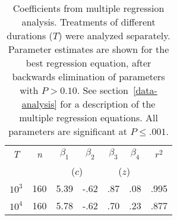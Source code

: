 
\begin{table}[btp!]
\caption{Coefficients from multiple regression analysis.  Treatments
  of different durations ($T$) were analyzed separately.  Parameter
  estimates are shown for the best regression equation, after backwards
  elimination of parameters with $P>0.10$.  See
  section~\protect\ref{data-analysis} for a description of the multiple
  regression equations.  All parameters are
  significant at $P\le .001$.
\label{tab:regress-coeffs}}
\begin{center}
\begin{tabular}{|c|c||cc|cc||c|} \hline
\emph{T} & \emph{n} & $\beta _1$ & $\beta _2$ & $\beta _3$ & $\beta _4$ & $r^2$ \\
 & & \multicolumn{2}{c|}{($c$)} & \multicolumn{2}{c||}{($z$)} & \\ \hline \hline
$10^3$ & 160 & 5.39 & -.62 & .87 & .08 & .995 \\
$10^4$ & 160 & 5.78 & -.62 & .70 & .23 & .877 \\ \hline
\end{tabular}
\end{center}
\end{table}

